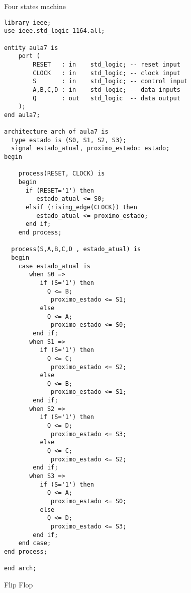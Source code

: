 \documentclass[12pt]{article}
\begin{document}
\Large

\begin{center}
Four states machine
\end{center}

\normalsize

\begin{verbatim}
library ieee;
use ieee.std_logic_1164.all;

entity aula7 is
    port (
        RESET   : in    std_logic; -- reset input
        CLOCK   : in    std_logic; -- clock input
        S       : in    std_logic; -- control input
        A,B,C,D : in    std_logic; -- data inputs
        Q       : out   std_logic  -- data output
    );
end aula7;

architecture arch of aula7 is
  type estado is (S0, S1, S2, S3);
  signal estado_atual, proximo_estado: estado;
begin

	process(RESET, CLOCK) is
	begin
	  if (RESET='1') then
		 estado_atual <= S0;
	  elsif (rising_edge(CLOCK)) then
		 estado_atual <= proximo_estado;
	  end if;
	end process;

  process(S,A,B,C,D , estado_atual) is
  begin
    case estado_atual is
	   when S0 =>
		  if (S='1') then
		    Q <= B;
			 proximo_estado <= S1;
		  else
		    Q <= A;
			 proximo_estado <= S0;
		end if;
	   when S1 =>
		  if (S='1') then
		    Q <= C;
			 proximo_estado <= S2;
		  else
		    Q <= B;
			 proximo_estado <= S1;
		end if;
  	   when S2 =>
		  if (S='1') then
		    Q <= D;
			 proximo_estado <= S3;
		  else
		    Q <= C;
			 proximo_estado <= S2;
		end if;
	   when S3 =>
		  if (S='1') then
		    Q <= A;
			 proximo_estado <= S0;
		  else
		    Q <= D;
			 proximo_estado <= S3;
		end if;
	end case;
end process;

end arch;
\end{verbatim}

\vspace{3mm}

\Large

\begin{center}
Flip Flop
\end{center}

\normalsize
\end{document}
